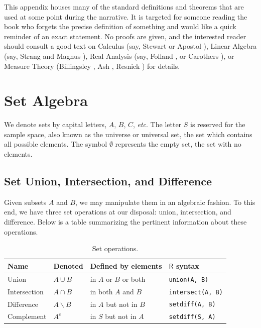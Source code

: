 \documentclass[captions=tableheading]{scrbook}
\begin{document}
\begin{example}
This appendix houses many of the standard definitions and theorems that are used at some point during the narrative. It is targeted for someone reading the book who forgets the precise definition of something and would like a quick reminder of an exact statement. No proofs are given, and the interested reader should consult a good text on Calculus (say, Stewart \cite{Stewart2008} or Apostol \cite{Apostol1967,ApostolI1967}), Linear Algebra (say, Strang \cite{Strang1988} and Magnus \cite{Magnus1999}), Real Analysis (say, Folland \cite{Folland1999}, or Carothers \cite{Carothers2000}), or Measure Theory (Billingsley \cite{Billingsley1995}, Ash \cite{Ash2000}, Resnick \cite{Resnick1999}) for details. 
\section{Set Algebra}
\label{sec-21-1}
\label{sec-The-Algebra-of}



We denote sets by capital letters, \(A\), \(B\), \(C\), \emph{etc}. The letter \(S\) is reserved for the sample space, also known as the universe or universal set, the set which contains all possible elements. The symbol \(\emptyset\) represents the empty set, the set with no elements. 
\subsection{Set Union, Intersection, and Difference}
\label{sec-21-1-1}


Given subsets \(A\) and \(B\), we may manipulate them in an algebraic fashion. To this end, we have three set operations at our disposal: union, intersection, and difference. Below is a table summarizing the pertinent information about these operations.

\begin{table}[htb]
\caption[Set operations]{Set operations.} \label{tab-Set-Operations}
\begin{center}
\begin{tabular}{llll}
 Name          &  Denoted            &  Defined by elements        &  \(\mathsf{R}\) syntax     \\
\hline
 Union         &  \(A\cup B\)        &  in \(A\) or \(B\) or both  &  \texttt{union(A, B)}      \\
 Intersection  &  \(A\cap B\)        &  in both \(A\) and \(B\)    &  \texttt{intersect(A, B)}  \\
 Difference    &  \(A\backslash B\)  &  in \(A\) but not in \(B\)  &  \texttt{setdiff(A, B)}    \\
 Complement    &  \(A^{c}\)          &  in \(S\) but not in \(A\)  &  \texttt{setdiff(S, A)}    \\
\end{tabular}
\end{center}
\end{table}

\end{example}
\end{document}
